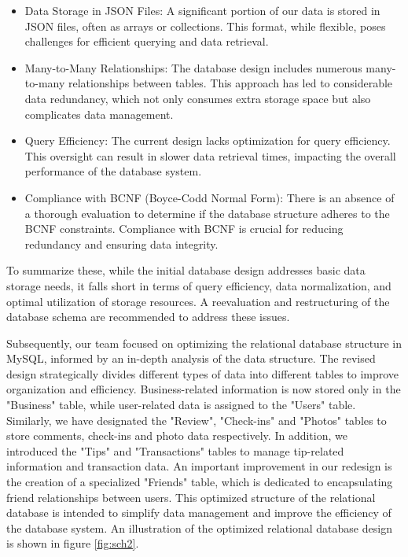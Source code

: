 \documentclass[runningheads]{llncs}
\begin{document}
\begin{itemize}
    \item Data Storage in JSON Files: A significant portion of our data is stored in JSON files, often as arrays or collections. This format, while flexible, poses challenges for efficient querying and data retrieval.

    \item Many-to-Many Relationships: The database design includes numerous many-to-many relationships between tables. This approach has led to considerable data redundancy, which not only consumes extra storage space but also complicates data management.

    \item Query Efficiency: The current design lacks optimization for query efficiency. This oversight can result in slower data retrieval times, impacting the overall performance of the database system.

    \item Compliance with BCNF (Boyce-Codd Normal Form): There is an absence of a thorough evaluation to determine if the database structure adheres to the BCNF constraints. Compliance with BCNF is crucial for reducing redundancy and ensuring data integrity.   
\end{itemize}


To summarize these, while the initial database design addresses basic data storage needs, it falls short in terms of query efficiency, data normalization, and optimal utilization of storage resources. A reevaluation and restructuring of the database schema are recommended to address these issues.

Subsequently, our team focused on optimizing the relational database structure in MySQL, informed by an in-depth analysis of the data structure. The revised design strategically divides different types of data into different tables to improve organization and efficiency. Business-related information is now stored only in the "Business" table, while user-related data is assigned to the "Users" table. Similarly, we have designated the "Review", "Check-ins" and "Photos" tables to store comments, check-ins and photo data respectively. In addition, we introduced the "Tips" and "Transactions" tables to manage tip-related information and transaction data. An important improvement in our redesign is the creation of a specialized "Friends" table, which is dedicated to encapsulating friend relationships between users. This optimized structure of the relational database is intended to simplify data management and improve the efficiency of the database system. An illustration of the optimized relational database design is shown in figure \ref{fig:sch2}.
\end{document}
